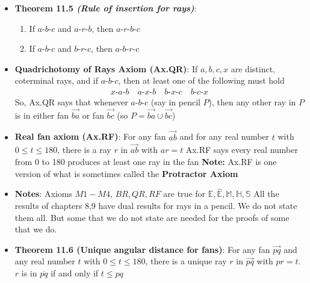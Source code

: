 \documentclass{report}
\begin{document}
\begin{itemize}
                \item \textbf{Theorem 11.5 \textit{(Rule of insertion for rays)}}:
                    \begin{enumerate}[label=(\alph*)]
                        \item If $ a\text{-}b\text{-}c$ and $ a\text{-}r\text{-}b$, then $ a\text{-}r\text{-}b\text{-}c $
                        \item If $ a\text{-}b\text{-}c $ and $ b\text{-}r\text{-}c $, then $ a\text{-}b\text{-}r\text{-}c $
                    \end{enumerate}
                \item \textbf{Quadrichotomy of Rays Axiom (Ax.QR)}: If $a,b,c,x$ are distinct, coterminal rays, and if $ a\text{-}b\text{-}c$, then at least one of the following must hold
                    \begin{align*}
                        x\text{-}a\text{-}b \quad a\text{-}x\text{-}b \quad b\text{-}x\text{-}c \quad b\text{-}c\text{-}x
                    \end{align*}
                    \bigbreak \noindent 
                    So, Ax.QR says that whenever $ a\text{-}b\text{-}c$ (say in pencil $P$), then any other ray in $P$ is in either fan $\overrightarrow{ba}$ or fan $\overrightarrow{bc} $ (so $P = \overrightarrow{ba} \cup \overrightarrow{bc} $)
                \item \textbf{Real fan axiom (Ax.RF)}: For any fan $\overrightarrow{ab} $ and for any real number $t$ with $ 0 \leq t \leq 180$, there is a ray $r$ in $\overrightarrow{ab} $ with $ar = t $
                    \bigbreak \noindent 
                    Ax.RF says every real number from 0 to 180 produces at least one ray in the fan
                    \bigbreak \noindent 
                    \textbf{Note:} Ax.RF is one version of what is sometimes called the \textbf{Protractor Axiom}
                \item \textbf{Notes}: Axioms $M1-M4$, $BR,QR,RF$ are true for $\mathbb{E}, \hat{\mathbb{E}}, \mathbb{M}, \mathbb{H}, \mathbb{S}$
                    \bigbreak \noindent 
                    All the results of chapters 8,9 have dual results for rays in a pencil. We do not state them all. But some that we do not state are needed for the proofs of some that we do.
                \item \textbf{Theorem 11.6 (Unique angular distance for fans)}: For any fan $\overrightarrow{pq}$ and any real number $t$ with $0 \leq t \leq 180$, there is a unique ray $r$ in $\overrightarrow{pq}$ with $pr = t$. $r$ is in $\overline{pq} $ if and only if $t \leq  pq$

\end{itemize}
\end{document}
